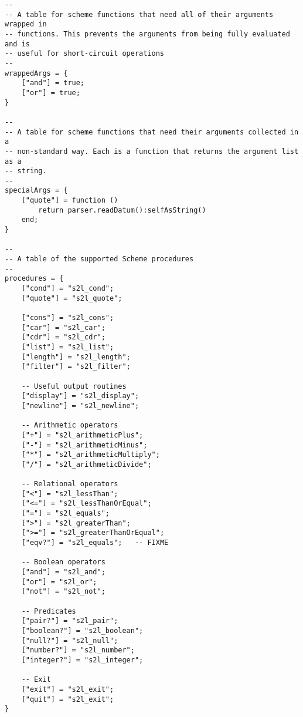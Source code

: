 \begin{verbatim}
--
-- A table for scheme functions that need all of their arguments wrapped in
-- functions. This prevents the arguments from being fully evaluated and is
-- useful for short-circuit operations
--
wrappedArgs = {
    ["and"] = true;
    ["or"] = true;
}

--
-- A table for scheme functions that need their arguments collected in a
-- non-standard way. Each is a function that returns the argument list as a
-- string.
--
specialArgs = {
    ["quote"] = function ()
        return parser.readDatum():selfAsString()
    end;
}

--
-- A table of the supported Scheme procedures
--
procedures = {
    ["cond"] = "s2l_cond";
    ["quote"] = "s2l_quote";

    ["cons"] = "s2l_cons";
    ["car"] = "s2l_car";
    ["cdr"] = "s2l_cdr";
    ["list"] = "s2l_list";
    ["length"] = "s2l_length";
    ["filter"] = "s2l_filter";

    -- Useful output routines
    ["display"] = "s2l_display";
    ["newline"] = "s2l_newline";

    -- Arithmetic operators
    ["+"] = "s2l_arithmeticPlus";
    ["-"] = "s2l_arithmeticMinus";
    ["*"] = "s2l_arithmeticMultiply";
    ["/"] = "s2l_arithmeticDivide";

    -- Relational operators
    ["<"] = "s2l_lessThan";
    ["<="] = "s2l_lessThanOrEqual";
    ["="] = "s2l_equals";
    [">"] = "s2l_greaterThan";
    [">="] = "s2l_greaterThanOrEqual";
    ["eqv?"] = "s2l_equals";   -- FIXME

    -- Boolean operators
    ["and"] = "s2l_and";
    ["or"] = "s2l_or";
    ["not"] = "s2l_not";

    -- Predicates
    ["pair?"] = "s2l_pair";
    ["boolean?"] = "s2l_boolean";
    ["null?"] = "s2l_null";
    ["number?"] = "s2l_number";
    ["integer?"] = "s2l_integer";

    -- Exit
    ["exit"] = "s2l_exit";
    ["quit"] = "s2l_exit";
}
\end{verbatim}

